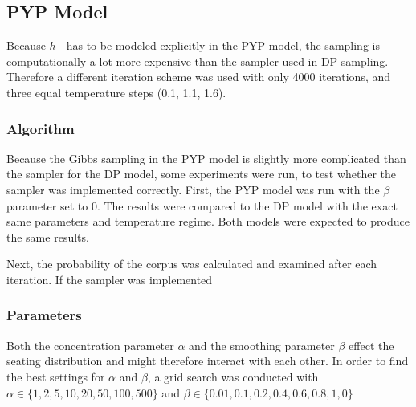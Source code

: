 \subsection{PYP Model}

Because $h^{-}$ has to be modeled explicitly in the PYP model, the sampling is computationally a lot more expensive than the sampler used in DP sampling. Therefore a different iteration scheme was used with only 4000 iterations, and three equal temperature steps (0.1, 1.1, 1.6).

\subsubsection{Algorithm}
Because the Gibbs sampling in the PYP model is slightly more complicated than the sampler for the DP model, some experiments were run, to test whether the sampler was implemented correctly.
First, the PYP model was run with the $\beta$ parameter set to 0. The results were compared to the DP model with the exact same parameters and temperature regime. Both models were expected to produce the same results.

Next, the probability of the corpus was calculated and examined after each iteration. If the sampler was implemented

\subsubsection{Parameters}
Both the concentration parameter $\alpha$ and the smoothing parameter $\beta$ effect the seating distribution and might therefore interact with each other. In order to find the best settings for $\alpha$ and $\beta$, a grid search was conducted with $\alpha \in \{1, 2, 5, 10, 20, 50, 100, 500 \}$ and $\beta \in \{ 0.01, 0.1, 0.2, 0.4,0.6, 0.8, 1, 0 \}$
